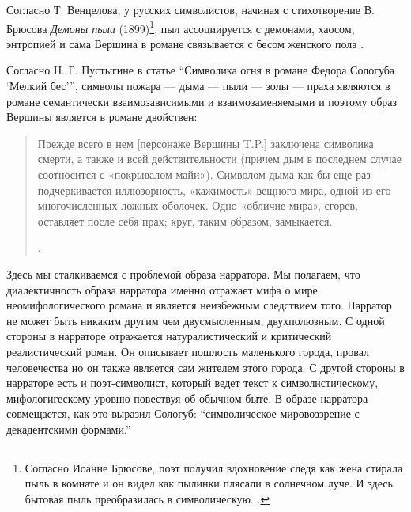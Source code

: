 \documentclass[12pt,a4paper]{article}
\begin{document}
Согласно Т. Венцелова, у русских символистов, начиная с стихотворение В. Брюсова \emph{Демоны пыли} (1899)\footnote{ Согласно Иоанне Брюсове, поэт получил вдохновение следя как жена стирала пыль в комнате и он видел как пылинки плясали в солнечном луче. И здесь бытовая пыль преобразилась в символическую. \parencite[600]{brjusov1973}.}, пыл ассоциируется с демонами, хаосом, энтропией и сама Вершина в романе связывается с бесом женского пола \parencite[42--44]{venclova2012}. 

Согласно Н. Г. Пустыгине в статье \enquote{Символика огня в романе Федора Сологуба \enquote{Мелкий бес}}, символы пожара — дыма — пыли — золы — праха являются в романе семантически взаимозависимыми и взаимозаменяемыми и поэтому образ Вершины является в романе двойствен:

\begin{quote}
Прежде всего в нем [персонаже Вершины T.P.] заключена символика смерти, а также и всей действительности (причем дым в последнем случае соотносится с «покрывалом майи»). Символом дыма как бы еще раз подчеркивается иллюзорность, «кажимость» вещного мира, одной из его многочисленных ложных оболочек. Одно «обличие мира», сгорев, оставляет после себя прах; круг, таким образом, замыкается.

\parencite{pustygina1989}.
\end{quote}

Здесь мы сталкиваемся с проблемой образа нарратора. Мы полагаем, что диалектичность образа нарратора именно отражает мифа о мире неомифологического романа и является неизбежным следствием того. Нарратор не может быть никаким другим чем двусмысленным, двухполюзным. С одной стороны в нарраторе отражается натуралистический и критический реалистический роман. Он описывает пошлость маленького города, провал человечества но он также является сам жителем этого города. С другой стороны в нарраторе есть и поэт-символист, который ведет текст к символистическому, мифологигескому уровню повествуя об обычном быте. В образе нарратора совмещается, как это выразил Сологуб: \enquote{символическое мировоззрение с декадентскими формами.}



\end{document}
